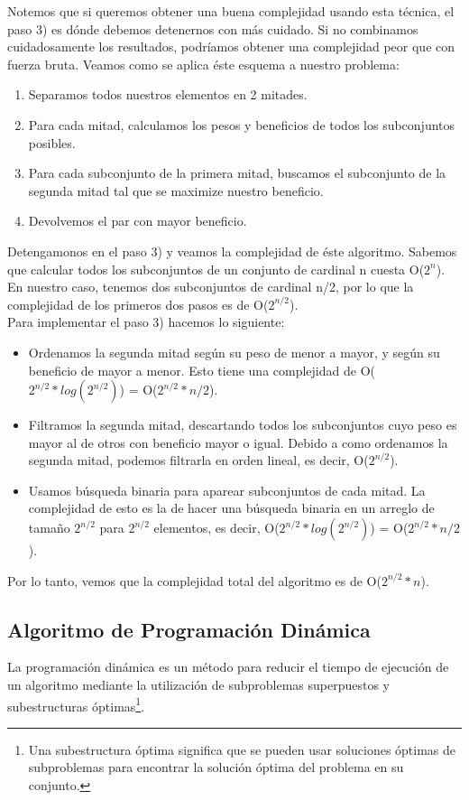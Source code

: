 Notemos que si queremos obtener una buena complejidad usando esta técnica, el paso 3) es dónde debemos detenernos con más cuidado. Si no combinamos cuidadosamente los resultados, podríamos obtener una complejidad peor que con fuerza bruta.
Veamos como se aplica éste esquema a nuestro problema:

\begin{enumerate}
\item Separamos todos nuestros elementos en 2 mitades.
\item Para cada mitad, calculamos los pesos y beneficios de todos los subconjuntos posibles.
\item Para cada subconjunto de la primera mitad, buscamos el subconjunto de la segunda mitad tal que se maximize nuestro beneficio.
\item Devolvemos el par con mayor beneficio.
\end{enumerate}

Detengamonos en el paso 3) y veamos la complejidad de éste algoritmo. Sabemos que calcular todos los subconjuntos de un conjunto de cardinal n cuesta O($2^{n}$). En nuestro caso, tenemos dos subconjuntos de cardinal n/2, por lo que la complejidad de los primeros dos pasos es de O($2^{n/2}$). \\
Para implementar el paso 3) hacemos lo siguiente:
\begin{itemize}
\item Ordenamos la segunda mitad según su peso de menor a mayor, y según su beneficio de mayor a menor. Esto tiene una complejidad de O($2^{n/2} * log(2^{n/2})$) = O($2^{n/2} * n/2$).
\item Filtramos la segunda mitad, descartando todos los subconjuntos cuyo peso es mayor al de otros con beneficio mayor o igual. Debido a como ordenamos la segunda mitad, podemos filtrarla en orden lineal, es decir, O($2^{n/2}$).
\item Usamos búsqueda binaria para aparear subconjuntos de cada mitad. La complejidad de esto es la de hacer una búsqueda binaria en un arreglo de tamaño $2^{n/2}$ para $2^{n/2}$ elementos, es decir, O($2^{n/2} * log(2^{n/2})$) = O($2^{n/2} * n/2$).
\end{itemize}

\bigskip

Por lo tanto, vemos que la complejidad total del algoritmo es de O($2^{n/2} * n$).

\subsection{Algoritmo de Programación Dinámica}
La programación dinámica es un método para reducir el tiempo de ejecución de un algoritmo mediante la utilización de subproblemas superpuestos y subestructuras óptimas\footnote{Una subestructura óptima significa que se pueden usar soluciones óptimas de subproblemas para encontrar la solución óptima del problema en su conjunto.}.


